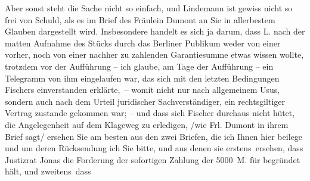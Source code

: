 \begin{ledgroupsized}[t]{13cm}
           \pstart
           Aber sonst steht die Sache nicht so einfach, und Lindemann ist gewiss nicht so frei von Schuld, als es im Brief des Fräulein
                  Dumont an Sie in allerbestem Glauben
               dargestellt wird.\pend
           \pstart
           Insbesondere handelt es sich ja darum, dass L.
               nach der matten Aufnahme des Stücks durch das Berliner Publikum weder
               von einer vorher, noch von einer nachher zu zahlenden Garantiesumme etwas wissen
               wollte, trotzdem vor der Aufführung – ich glaube, am Tage der Aufführung – ein
               Telegramm \introOben{}von ihm\introOben{} eingelaufen war, das sich mit den letzten
               Bedingungen Fischers einverstanden erklärte, –
               womit nicht nur nach allgemeinem Usus, sondern auch nach dem Urteil juridischer
               Sachverständiger, ein rechtsgiltiger Vertrag zustande gekommen war; \introOben{}–\introOben{} und dass sich Fischer
               durchaus nicht hütet, die Angelegenheit auf dem Klageweg zu erledi{\pb}gen, /wie Frl. Dumont in ihrem Brief sagt/ ersehen Sie am besten aus den zwei Briefen, die
               ich Ihnen hier beilege und um deren Rücksendung ich Sie bitte, und aus denen sie
               erstens ersehen, dass Justizrat Jonas die
               Forderung der sofortigen Zahlung der 5000 M. für begründet hält, und zweitens dass

\end{ledgroupsized}
